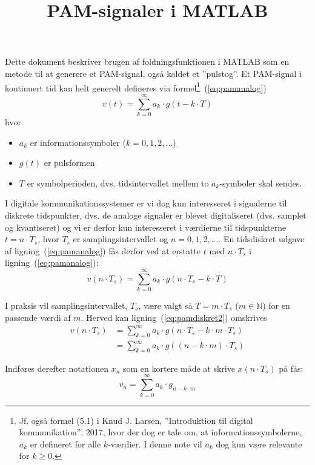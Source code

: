 \documentclass[dvips,11pt,a4paper]{article}
\title{PAM-signaler i MATLAB}
\author{}
\date{}
\begin{document}
\maketitle

\noindent{}Dette dokument beskriver brugen af foldningsfunktionen i MATLAB som en metode til at generere et PAM-signal, også kaldet et ''pulstog''. Et PAM-signal i kontinuert tid kan helt generelt defineres via formel\footnote{Jf. også formel (5.1) i Knud J. Larsen, ''Introduktion til digital kommunikation'', 2017, hvor der dog er tale om, at informationssymbolerne, $a_k$ er defineret for alle $k$-værdier. I denne note vil $a_k$ dog kun være relevante for $k\ge{}0$.}~(\ref{eq:pamanalog})
\begin{equation}
v(t)=\sum_{k=0}^{\infty} a_{k} \cdot g(t-k \cdot T)
\label{eq:pamanalog}
\end{equation}
hvor
\begin{itemize}
\item $a_k$ er informationssymboler ($k=0,1,2,\ldots$)
\item $g(t)$ er pulsformen
\item $T$ er symbolperioden, dvs. tidsintervallet mellem to $a_k$-symboler skal sendes.
\end{itemize}

\noindent{}I digitale kommunikationssystemer er vi dog kun interesseret i signalerne til diskrete tidspunkter, dvs. de analoge signaler er blevet digitaliseret (dvs. samplet og kvantiseret) og vi er derfor kun interesseret i værdierne til tidspunkterne $t = n \cdot T_{s}$, hvor $T_s$ er samplingsintervallet og $n = 0,1,2,\ldots$. En tidsdiskret udgave af ligning~(\ref{eq:pamanalog}) fås derfor ved at erstatte $t$ med $n \cdot T_s$ i ligning~(\ref{eq:pamanalog}):
\begin{equation}
v(n \cdot T_{s})=\sum_{k=0}^{\infty} a_{k} \cdot g(n \cdot T_{s}-k \cdot T)
\label{eq:pamdiskret2}
\end{equation}

\noindent{}I praksis vil samplingsintervallet, $T_s$, være valgt så $T = m \cdot T_s$ ($m \in \mathbb{N}$) for en passende værdi af $m$. Herved kan ligning~(\ref{eq:pamdiskret2}) omskrives
\begin{align}
v(n \cdot T_{s}) &= \sum_{k=0}^{\infty} a_{k} \cdot g(n \cdot T_{s}-k \cdot m \cdot T_s) \\
 &= \sum_{k=0}^{\infty} a_{k} \cdot g((n - k \cdot m) \cdot T_{s}) 
\end{align}

\noindent{}Indføres derefter notationen $x_n$ som en kortere måde at skrive $x(n \cdot T_s)$ på fås:
\begin{equation}
v_n = \sum_{k=0}^{\infty} a_{k} \cdot g_{n - k \cdot m}
\label{eq:pamdiskret}
\end{equation}
\end{document}
